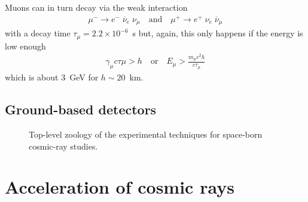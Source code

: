 Muons can in turn decay via the weak interaction
\begin{align*}
  \mu^- \rightarrow e^- \; \overline{\nu}_e \; \nu_\mu
  \quad\text{and}\quad
  \mu^+ \rightarrow e^+ \; \nu_e \; \overline{\nu}_\mu
\end{align*}
with a decay time $\tau_\mu = 2.2 \times 10^{-6}$~s but, again, this only happens
if the energy is low enough
\begin{align*}
  \gamma_\mu c \tau\mu > h
  \quad\text{or}\quad
  E_\mu > \frac{m_\mu c^2 h}{c\tau_\mu}
\end{align*}
which is about $3$~GeV for $h \sim 20$~km.


\subsection{Ground-based detectors}


\begin{figure}[htb!]
  \begin{center}
  \end{center}
  \caption{Top-level zoology of the experimental techniques for space-born
    cosmic-ray studies.}
  \label{fig:cr_space_detectors}
\end{figure}


\section{Acceleration of cosmic rays}\label{sec:cr_acceleration}

